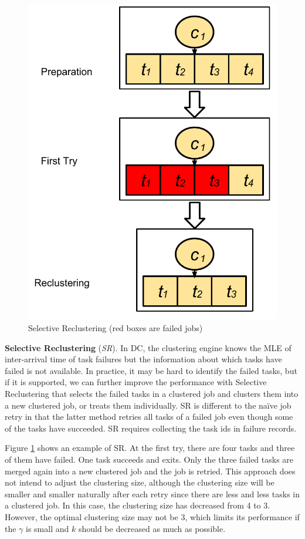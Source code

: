 \documentclass{IOS-Book-Article}
\begin{document}
\begin{figure}[!htb]
\centering
  \includegraphics[width=0.55\linewidth]{sr.pdf}
  \caption{Selective Reclustering (red boxes are failed jobs)}
  \label{fig:clustering_sr}
\end{figure}

\textbf{Selective Reclustering} (\emph{SR}). 
In DC, the clustering engine knows the MLE of inter-arrival time of task failures but the information about which tasks have failed is not available. In practice, it may be hard to identify the failed tasks, but if it is supported, we can further improve the performance with Selective Reclustering that selects the failed tasks in a clustered job and clusters them into a new clustered job, or treats them individually. SR is different to the naïve job retry in that the latter method retries all tasks of a failed job even though some of the tasks have succeeded. SR requires collecting the task ids in failure records. 

Figure \ref{fig:clustering_sr} shows an example of SR. At the first try, there are four tasks and three of them have failed. One task succeeds and exits. Only the three failed tasks are merged again into a new clustered job and the job is retried. This approach does not intend to adjust the clustering size, although the clustering size will be smaller and smaller naturally after each retry since there are less and less tasks in a clustered job. In this case, the clustering size has decreased from 4 to 3. However, the optimal clustering size may not be 3, which limits its performance if the $\gamma$ is small and $k$ should be decreased as much as possible. 
 
\end{document}
